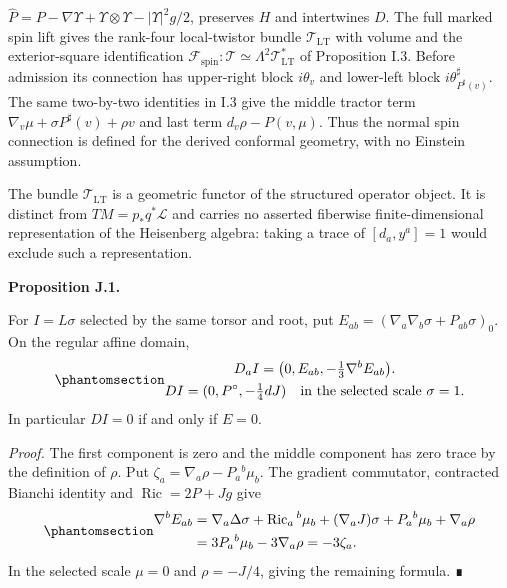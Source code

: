 \documentclass[
  english,
  11pt,
  reqno]{amsart}
\makeatletter
\newcommand{\pandocstatementheading}[1]{%
  \par\addpenalty{\@beginparpenalty}%
  \addvspace{.5\baselineskip plus .2\baselineskip minus .2\baselineskip}%
  {\normalfont\bfseries #1\par}%
  \nobreak\@afterindenttrue\@afterheading
}
\makeatother
\begin{document}
\(\widehat P=P-\nabla\Upsilon+\Upsilon\otimes\Upsilon-|\Upsilon|^2g/2\),
preserves \(H\) and intertwines \(D\). The full marked spin lift gives
the rank-four local-twistor bundle \(\mathcal T_{\mathrm{LT}}\) with
volume and the exterior-square identification
\(\mathcal F_{\mathrm{spin}}:\mathcal T\simeq\Lambda^2\mathcal T_{\mathrm{LT}}^*\)
of Proposition I.3. Before admission its connection has upper-right
block \(i\theta_v\) and lower-left block
\(i\theta_{P^\sharp(v)}^\sharp\). The same two-by-two identities in I.3
give the middle tractor term \(\nabla_v\mu+\sigma P^\sharp(v)+\rho v\)
and last term \(d_v\rho-P(v,\mu)\). Thus the normal spin connection is
defined for the derived conformal geometry, with no Einstein assumption.

The bundle \(\mathcal T_{\mathrm{LT}}\) is a geometric functor of the
structured operator object. It is distinct from \(TM=p_*q^*\mathcal L\)
and carries no asserted fiberwise finite-dimensional representation of
the Heisenberg algebra: taking a trace of \([d_a,y^a]=1\) would exclude
such a representation.

\pandocstatementheading{\protect{}\label{prop:gg-exact-ward-defect}Proposition J.1.}

For \(I=L\sigma\) selected by the same torsor and root, put
\(E_{ab}=(\nabla_a\nabla_b\sigma+P_{ab}\sigma)_0\). On the regular
affine domain,
\begin{equation}\protect\phantomsection\label{eq:gg-exact-ward-defect}{\begin{gathered}
D_aI=\bigl(0,E_{ab},-\tfrac13\nabla^bE_{ab}\bigr). \\
DI=(0,P^\circ,-\tfrac14dJ)
 \quad\text{in the selected scale }\sigma=1.
\end{gathered}}\end{equation} In particular \(DI=0\) if and only if \(E=0\).

\emph{Proof.} The first component is zero and the middle component has
zero trace by the definition of \(\rho\). Put
\(\zeta_a=\nabla_a\rho-P_a{}^b\mu_b\). The gradient commutator,
contracted Bianchi identity and \(\operatorname{Ric}=2P+Jg\) give
\begin{equation}\protect\phantomsection\label{eq:gg-ward-defect-divergence}{
 \begin{aligned}
 \nabla^bE_{ab}
 &=\nabla_a\Delta\sigma+\operatorname{Ric}_a{}^b\mu_b
   +(\nabla_aJ)\sigma+P_a{}^b\mu_b+\nabla_a\rho\\
 &=3P_a{}^b\mu_b-3\nabla_a\rho=-3\zeta_a.
 \end{aligned}
}\end{equation} In the selected scale \(\mu=0\) and \(\rho=-J/4\),
giving the remaining formula. ∎
\end{document}
